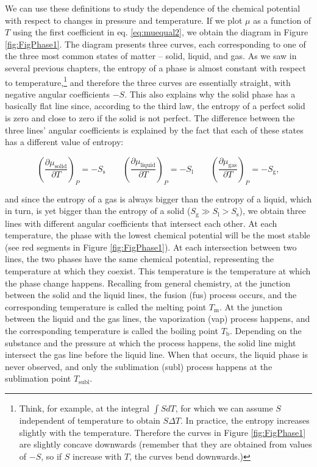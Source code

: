 \documentclass[
  9pt,
]{extbook}
\theoremstyle{definition}
\theoremstyle{definition}
\theoremstyle{definition}
\theoremstyle{remark}
\begin{document}
We can use these definitions to study the dependence of the chemical potential with respect to changes in pressure and temperature. If we plot \(\mu\) as a function of \(T\) using the first coefficient in eq. \eqref{eq:muequal2}, we obtain the diagram in Figure \ref{fig:FigPhase1}. The diagram presents three curves, each corresponding to one of the three most common states of matter -- solid, liquid, and gas. As we saw in several previous chapters, the entropy of a phase is almost constant with respect to temperature,\footnote{Think, for example, at the integral \(\int SdT\), for which we can assume \(S\) independent of temperature to obtain \(S\Delta T\). In practice, the entropy increases slightly with the temperature. Therefore the curves in Figure \ref{fig:FigPhase1} are slightly concave downwards (remember that they are obtained from values of \(-S\), so if \(S\) increase with \(T\), the curves bend downwards.)} and therefore the three curves are essentially straight, with negative angular coefficients \(-S\). This also explains why the solid phase has a basically flat line since, according to the third law, the entropy of a perfect solid is zero and close to zero if the solid is not perfect. The difference between the three lines' angular coefficients is explained by the fact that each of these states has a different value of entropy:

\begin{equation}
\left( \frac{\partial \mu_{\text{solid}}}{\partial T} \right)_P =-S_{\text{s}} \qquad \left( \frac{\partial \mu_{\text{liquid}}}{\partial T} \right)_P =-S_{\text{l}} \qquad \left( \frac{\partial \mu_{\text{gas}}}{\partial T} \right)_P =-S_{\text{g}},
\label{eq:muequal3}
\end{equation}

and since the entropy of a gas is always bigger than the entropy of a liquid, which in turn, is yet bigger than the entropy of a solid (\(S_{\text{g}} \gg S_{\text{l}}>S_{\text{s}}\)), we obtain three lines with different angular coefficients that intersect each other. At each temperature, the phase with the lowest chemical potential will be the most stable (see red segments in Figure \ref{fig:FigPhase1}). At each intersection between two lines, the two phases have the same chemical potential, representing the temperature at which they coexist. This temperature is the temperature at which the phase change happens. Recalling from general chemistry, at the junction between the solid and the liquid lines, the fusion (fus) process occurs, and the corresponding temperature is called the melting point \(T_{\text{m}}\). At the junction between the liquid and the gas lines, the vaporization (vap) process happens, and the corresponding temperature is called the boiling point \(T_{\text{b}}\). Depending on the substance and the pressure at which the process happens, the solid line might intersect the gas line before the liquid line. When that occurs, the liquid phase is never observed, and only the sublimation (subl) process happens at the sublimation point \(T_{\text{subl}}\).
\end{document}
